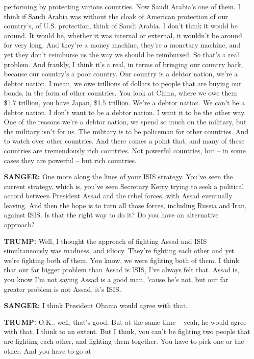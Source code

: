 performing by protecting various countries. Now Saudi Arabia's one of
them. I think if Saudi Arabia was without the cloak of American
protection of our country's, of U.S. protection, think of Saudi Arabia.
I don't think it would be around. It would be, whether it was internal
or external, it wouldn't be around for very long. And they're a money
machine, they're a monetary machine, and yet they don't reimburse us the
way we should be reimbursed. So that's a real problem. And frankly, I
think it's a real, in terms of bringing our country back, because our
country's a poor country. Our country is a debtor nation, we're a debtor
nation. I mean, we owe trillions of dollars to people that are buying
our bonds, in the form of other countries. You look at China, where we
owe them \$1.7 trillion, you have Japan, \$1.5 trillion. We're a debtor
nation. We can't be a debtor nation. I don't want to be a debtor nation.
I want it to be the other way. One of the reasons we're a debtor nation,
we spend so much on the military, but the military isn't for us. The
military is to be policeman for other countries. And to watch over other
countries. And there comes a point that, and many of these countries are
tremendously rich countries. Not powerful countries, but -- in some
cases they are powerful -- but rich countries.

\textbf{SANGER:} One more along the lines of your ISIS strategy. You've
seen the current strategy, which is, you've seen Secretary Kerry trying
to seek a political accord between President Assad and the rebel forces,
with Assad eventually leaving. And then the hope is to turn all those
forces, including Russia and Iran, against ISIS. Is that the right way
to do it? Do you have an alternative approach?

\textbf{TRUMP:} Well, I thought the approach of fighting Assad and ISIS
simultaneously was madness, and idiocy. They're fighting each other and
yet we're fighting both of them. You know, we were fighting both of
them. I think that our far bigger problem than Assad is ISIS, I've
always felt that. Assad is, you know I'm not saying Assad is a good man,
'cause he's not, but our far greater problem is not Assad, it's ISIS.

\textbf{SANGER:} I think President Obama would agree with that.

\textbf{TRUMP:} O.K., well, that's good. But at the same time -- yeah,
he would agree with that, I think to an extent. But I think, you can't
be fighting two people that are fighting each other, and fighting them
together. You have to pick one or the other. And you have to go at --

